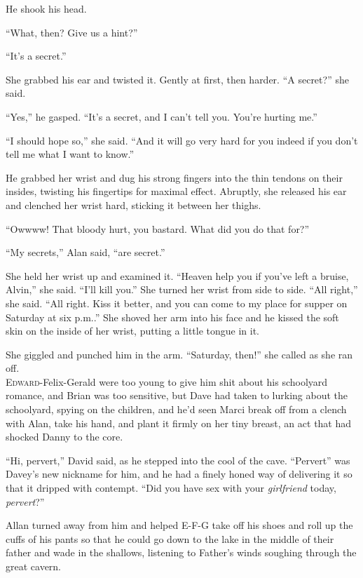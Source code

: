 He shook his head.

``What, then?  Give us a hint?''

``It's a secret.''

She grabbed his ear and twisted it.  Gently at first, then harder. 
``A secret?'' she said.

``Yes,'' he gasped.  ``It's a secret, and I can't tell you.  You're
hurting me.''

``I should hope so,'' she said.  ``And it will go very hard for you
indeed if you don't tell me what I want to know.''

He grabbed her wrist and dug his strong fingers into the thin tendons
on their insides, twisting his fingertips for maximal effect. 
Abruptly, she released his ear and clenched her wrist hard, sticking
it between her thighs.

``Owwww!  That bloody hurt, you bastard.  What did you do that for?''

``My secrets,'' Alan said, ``are secret.''

She held her wrist up and examined it.  ``Heaven help you if you've
left a bruise, Alvin,'' she said.  ``I'll kill you.'' She turned her
wrist from side to side.  ``All right,'' she said.  ``All right.  Kiss
it better, and you can come to my place for supper on Saturday at six
p.m..'' She shoved her arm into his face and he kissed the soft skin
on the inside of her wrist, putting a little tongue in it.

She giggled and punched him in the arm.  ``Saturday, then!'' she
called as she ran off.
\\
\lettrine[lines=3, lhang=.5, nindent=0pt, findent=2pt]{E}{dward}-Felix-Gerald were too young to give him shit about his
schoolyard romance, and Brian was too sensitive, but Dave had taken to
lurking about the schoolyard, spying on the children, and he'd seen
Marci break off from a clench with Alan, take his hand, and plant it
firmly on her tiny breast, an act that had shocked Danny to the core.

``Hi, pervert,'' David said, as he stepped into the cool of the cave. 
``Pervert'' was Davey's new nickname for him, and he had a finely
honed way of delivering it so that it dripped with contempt.  ``Did
you have sex with your \textit{girlfriend} today, \textit{pervert}?''

Allan turned away from him and helped E-F-G take off his shoes and
roll up the cuffs of his pants so that he could go down to the lake in
the middle of their father and wade in the shallows, listening to
Father's winds soughing through the great cavern.

